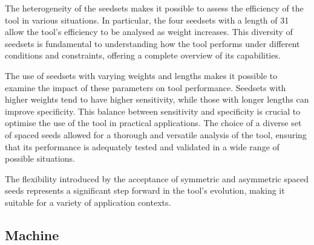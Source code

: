 	The heterogeneity of the seedsets makes it possible to assess the efficiency of the tool in various situations. In particular, the four seedsets with a length of 31 allow the tool's efficiency to be analysed as weight increases. This diversity of seedsets is fundamental to understanding how the tool performs under different conditions and constraints, offering a complete overview of its capabilities. 
	
	The use of seedsets with varying weights and lengths makes it possible to examine the impact of these parameters on tool performance. Seedsets with higher weights tend to have higher sensitivity, while those with longer lengths can improve specificity. This balance between sensitivity and specificity is crucial to optimise the use of the tool in practical applications. The choice of a diverse set of spaced seeds allowed for a thorough and versatile analysis of the tool, ensuring that its performance is adequately tested and validated in a wide range of possible situations.
	
	The flexibility introduced by the acceptance of symmetric and asymmetric spaced seeds represents a significant step forward in the tool's evolution, making it suitable for a variety of application contexts.
	
	
	
	
	\subsection{Machine}
	\label{subsec:machine}
	

